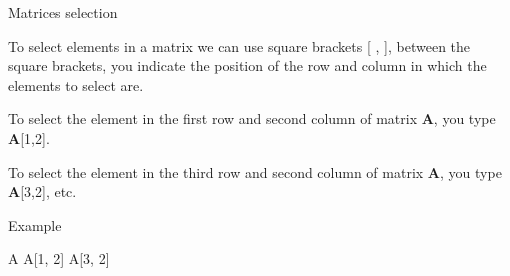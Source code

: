 \documentclass[
  ignorenonframetext,
]{beamer}
\newenvironment{Shaded}{\begin{snugshade}}{\end{snugshade}}
\newcommand{\DecValTok}[1]{\textcolor[rgb]{0.00,0.00,0.81}{#1}}
\newcommand{\NormalTok}[1]{#1}
\begin{document}
\begin{frame}[fragile]{Matrices selection}
\protect\hypertarget{matrices-selection}{}

To select elements in a matrix we can use square brackets {[} , {]},
between the square brackets, you indicate the position of the row and
column in which the elements to select are.

To select the element in the first row and second column of matrix
\textbf{A}, you type \textbf{A}{[}1,2{]}.

To select the element in the third row and second column of matrix
\textbf{A}, you type \textbf{A}{[}3,2{]}, etc.

\begin{block}{Example}

\begin{Shaded}
\begin{Highlighting}[]
\NormalTok{A}
\NormalTok{A[}\DecValTok{1}\NormalTok{, }\DecValTok{2}\NormalTok{]}
\NormalTok{A[}\DecValTok{3}\NormalTok{, }\DecValTok{2}\NormalTok{]}
\end{Highlighting}
\end{Shaded}

\end{block}

\end{frame}
\end{document}
